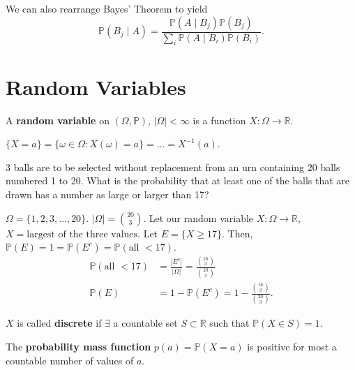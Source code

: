 \begin{theorem}
	We can also rearrange Bayes' Theorem to yield
	\[
		\mathbb{P}(B_j \mid A) = \frac{\mathbb{P}(A \mid  B_j)\mathbb{P}(B_j)}{\sum_i \mathbb{P}(A\mid B_i) \mathbb{P}(B_i)}
	.\] 
\end{theorem}

\section{Random Variables}

\begin{definition}
	A \textbf{random variable} on \( (\Omega, \mathbb{P}) \), \( |\Omega | < \infty \) is a function \( X: \Omega  \to  \mathbb{R} \).
\end{definition}

\begin{notation}
	\( \{X = a\} = \{ \omega  \in \Omega : X(\omega ) = a \} = \ldots = X^{-1}(a) \).
\end{notation}

\begin{eg}
	3 balls are to be selected without replacement from an urn containing 20 balls numbered 1 to 20. What is the probability that at least one of the balls that are drawn has a number as large or larger than 17?
\end{eg}
\begin{explanation}
	\( \Omega =\{1,2,3,\ldots ,20\}   \). \( |\Omega | = \binom{20}{3} \). Let our random variable \( X : \Omega \to \mathbb{R} \), \( X=\text{largest of the three values} \). Let \( E=\{X\ge 17\}   \). Then, \( \mathbb{P}(E)=1 = \mathbb{P}(E^{c}) = \mathbb{P}(\text{all } < 17) \).
	\begin{align*}
		\mathbb{P}(\text{all } < 17) &= \frac{|E^{c}|}{|\Omega |} = \frac{\binom{16}{3}}{\binom{20}{3}} \\
		\mathbb{P}(E) &= 1 - \mathbb{P}(E^{c}) = 1 - \frac{\binom{16}{3}}{\binom{20}{3}}
	.\end{align*}
\end{explanation}

\begin{definition}
	\( X \) is called \textbf{discrete} if \( \exists  \) a countable set \( S \subset \mathbb{R} \) such that \( \mathbb{P}(X \in S) = 1 \).
\end{definition}

\begin{definition}
	The \textbf{probability mass function} \( p(a)=\mathbb{P}(X = a) \) is positive for most a countable number of values of \( a \).
\end{definition}

